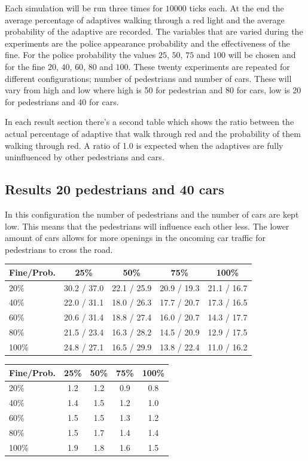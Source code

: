 \documentclass[a4paper]{article}
\begin{document}
Each simulation will be run three times for $10000$ ticks each. At the end the average percentage of adaptives walking through a red light and the average probability of the adaptive are recorded. The variables that are varied during the experiments are the police appearance probability and the effectiveness of the fine. For the police probability the values $25$, $50$, $75$ and $100$ will be chosen and for the fine $20$, $40$, $60$, $80$ and $100$. These twenty experiments are repeated for different configurations; number of pedestrians and number of cars. These will vary from high and low where high is 50 for pedestrian and 80 for cars, low is 20 for pedestrians and 40 for cars.

In each result section there's a second table which shows the ratio between the actual percentage of adaptive that walk through red and the probability of them walking through red. A ratio of 1.0 is expected when the adaptives are fully uninfluenced by other pedestrians and cars.

\clearpage
\subsection{Results 20 pedestrians and 40 cars}
In this configuration the number of pedestrians and the number of cars are kept low. This means that the pedestrians will influence each other less. The lower amount of cars allows for more openings in the oncoming car traffic for pedestrians to cross the road.

\begin{table}[H]
\centering
\begin{tabular}{ l | c c c c }
  Fine\slash Prob. & 25\% & 50\% & 75\% & 100\% \\ 
  \hline
  20\%  & 30.2 / 37.0 & 22.1 / 25.9 & 20.9 / 19.3 & 21.1 / 16.7  \\
  40\%  & 22.0 / 31.1 & 18.0 / 26.3 & 17.7 / 20.7 & 17.3 / 16.5  \\
  60\%  & 20.6 / 31.4 & 18.8 / 27.4 & 16.0 / 20.7 & 14.3 / 17.7  \\
  80\%  & 21.5 / 23.4 & 16.3 / 28.2 & 14.5 / 20.9 & 12.9 / 17.5  \\
  100\% & 24.8 / 27.1 & 16.5 / 29.9 & 13.8 / 22.4 & 11.0 / 16.2  \\
\end{tabular}
\end{table}

\begin{table}[H]
\centering
\begin{tabular}{ l | c c c c }
  Fine\slash Prob. & 25\% & 50\% & 75\% & 100\% \\ 
  \hline
  20\%  & 1.2 & 1.2 & 0.9 & 0.8  \\
  40\%  & 1.4 & 1.5 & 1.2 & 1.0  \\
  60\%  & 1.5 & 1.5 & 1.3 & 1.2  \\
  80\%  & 1.5 & 1.7 & 1.4 & 1.4  \\
  100\% & 1.9 & 1.8 & 1.6 & 1.5  \\
\end{tabular}
\end{table}
\end{document}
